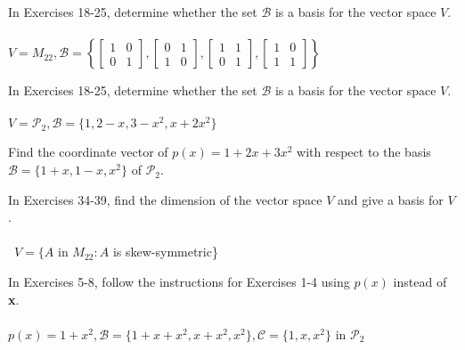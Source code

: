 \documentclass[12pt,letterpaper]{hmcpset}
\newcommand{\m}[1]{\begin{bmatrix} #1 \end{bmatrix}}
\begin{document}

\begin{problem}[6.2.20]
    In Exercises 18-25, determine whether the set $\mathcal{B}$ is a
    basis for the vector space $V$.\\\\
    $V=M_{22},\mathcal{B}=\left\{\m{1&0\\0&1},\m{0&1\\1&0},\m{1&1\\0&1},
    \m{1&0\\1&1}\right\}$
\end{problem}
\begin{solution}
    \vfill
\end{solution}
\newpage

\begin{problem}[6.2.25]
    In Exercises 18-25, determine whether the set $\mathcal{B}$ is a
    basis for the vector space $V$.\\\\
    $V=\mathscr{P}_2,\mathcal{B}=\{1,2-x,3-x^2,x+2x^2\}$
\end{problem}
\begin{solution}
    \vfill
\end{solution}
\newpage

\begin{problem}[6.2.28]
    Find the coordinate vector of $p(x)=1+2x+3x^2$ with respect to the basis
    $\mathcal{B}=\{1+x,1-x,x^2\}$ of $\mathscr{P}_2$.
\end{problem}
\begin{solution}
    \vfill
\end{solution}
\newpage

\begin{problem}[6.2.38]
    In Exercises 34-39, find the dimension of the vector space $V$ and give a
    basis for $V$.\\\\\
    $V=\{A$ in $M_{22}:A$ is skew-symmetric\}
\end{problem}
\begin{solution}
    \vfill
\end{solution}
\newpage

\begin{problem}[6.3.7]
    In Exercises 5-8, follow the instructions for Exercises 1-4 using $p(x)$
    instead of \textbf{x}.\\\\
    $p(x)=1+x^2,\mathcal{B}=\{1+x+x^2,x+x^2,x^2\},\mathcal{C}=\{1,x,x^2\}$ in
    $\mathscr{P}_2$
\end{problem}
\begin{solution}
    \vfill
\end{solution}
\newpage
\end{document}
